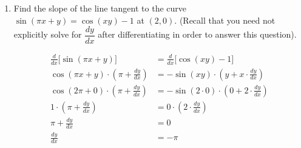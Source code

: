 \documentclass{article}
\begin{document}
\begin{enumerate}
\begin{solution}
    Because $m(x)$ is a function that takes the form of $f(x)^{g(x)}$, let's use logarithmic differentiation to find $m'(x)$:
    \begin{align*}
        \ln[m(x)]&=\ln(x^{\cos x}) \\
        \ln[m(x)]&=\cos x\cdot\ln x \\
        \frac{d}{dx}\Biggl[\ln[m(x)]\Biggr]&=\frac{d}{dx}(\cos x\cdot\ln x) \\
        \frac{1}{m(x)}\cdot m'(x)&= -\sin x \cdot \ln x + \cos x \cdot \frac{1}{x} \\
        \frac{m'(x)}{m(x)}&= -\sin x \cdot \ln x + \frac{\cos x}{x} \\ 
        m'(x)&= m(x)\left[-\sin x \cdot \ln x + \frac{\cos x}{x}\right] \\ 
         m'(x)&=x^{\cos x}\left[-\sin x \cdot \ln x + \frac{\cos x}{x}\right]
    \end{align*}
\end{solution}
\vfill\vfill

\begin{workshop}
    This is an exam-type problem. If you choose to bring the class together to debrief this problem, please be sure to highlight moments when implicit differentiation is required, and how to handle these moments when product rule or sum rule for derivatives is needed in tandem. Please avoid explicitly solving for $\frac{dy}{dx}$ before plugging in $x=2$ and $y=0$, as this generates an unnecessary amount of computation prone to algebraic errors.
\end{workshop}

\item Find the slope of the line tangent to the curve $\sin(\pi x+y) = \cos(xy) - 1$ at $(2, 0)$. (Recall that you need not explicitly solve for $\dfrac{dy}{dx}$ after differentiating in order to answer this question). 

\begin{solution}
\begin{align*}
    \frac{d}{dx} \biggl[\sin(\pi x+y)\biggr] &= \frac{d}{dx}\biggl[\cos(xy) - 1\biggr] \\
    \cos(\pi x+y)\cdot\left(\pi + \frac{dy}{dx}\right) &= -\sin(xy)\cdot \left(y+x\cdot\frac{dy}{dx}\right) \\
    \cos(2\pi+0)\cdot\left(\pi + \frac{dy}{dx}\right) &= -\sin(2\cdot0)\cdot \left(0+2\cdot\frac{dy}{dx}\right) \\
     1\cdot\left(\pi + \frac{dy}{dx}\right) &= 0\cdot \left(2\cdot\frac{dy}{dx}\right) \\
       \pi + \frac{dy}{dx} &= 0 \\
      \frac{dy}{dx} &= -\pi \\
\end{align*}
\end{solution}
\vfill\vfill\vfill


\end{enumerate}
\end{document}
